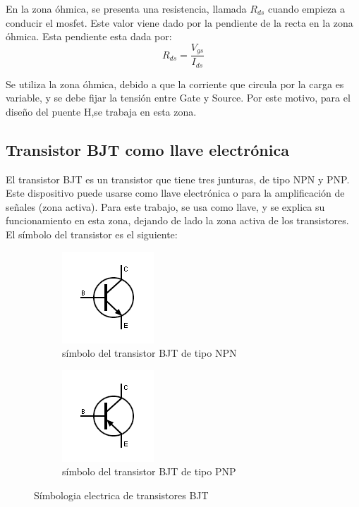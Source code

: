 En la zona óhmica, se presenta una resistencia, llamada $R_{ds}$ cuando empieza a conducir el mosfet. Este valor viene dado por la pendiente de la recta en la zona óhmica. Esta pendiente esta dada por:
\begin{equation*}
	R_{ds} =\frac {V_{gs}}{I_{ds}} 
\end{equation*}

Se utiliza la zona óhmica, debido a que la corriente que circula por la carga es variable, y se debe fijar la tensión entre Gate y Source. Por este motivo, para el diseño del puente H,se trabaja en  esta zona. 

\subsection{Transistor BJT como llave electrónica} \label{sub:bjt_llave}

El transistor BJT es un transistor que tiene tres junturas, de tipo NPN y PNP. Este dispositivo puede usarse como llave electrónica o para la amplificación de señales (zona activa). Para este trabajo, se usa como llave, y se explica su funcionamiento en esta zona, dejando de lado la zona activa de los transistores. El símbolo del transistor es el siguiente: 
\vspace{-5mm}
\begin{figure}[h]
	\begin{subfigure}{0.5\textwidth}
		\includegraphics{simbol_npn}
		\caption{símbolo del transistor BJT de tipo NPN }
	\end{subfigure}
	\hfill 
	\begin{subfigure}[h]{0.5\textwidth}
		\includegraphics{simbol_pnp}
		\caption{símbolo del transistor BJT de tipo PNP }
	\end{subfigure} 
\caption{Símbologia electrica de transistores BJT} 
\end{figure}
\vspace{-5mm}

